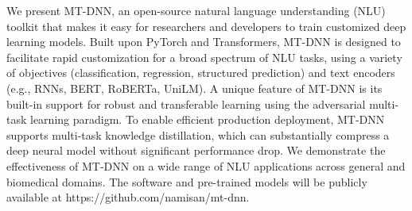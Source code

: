We present MT-DNN, an open-source natural language understanding (NLU) toolkit that makes it easy for researchers and developers to train customized deep learning models. Built upon PyTorch and Transformers, MT-DNN is designed to facilitate rapid customization for a broad spectrum of NLU tasks, using a variety of objectives (classification, regression, structured prediction) and text encoders (e.g., RNNs, BERT, RoBERTa, UniLM). A unique feature of MT-DNN is its built-in support for robust and transferable learning using the adversarial multi-task learning paradigm. To enable efficient production deployment, MT-DNN supports multi-task knowledge distillation, which can substantially compress a deep neural model without significant performance drop. We demonstrate the effectiveness of MT-DNN on a wide range of NLU applications across general and biomedical domains. The software and pre-trained models will be publicly available at https://github.com/namisan/mt-dnn.

